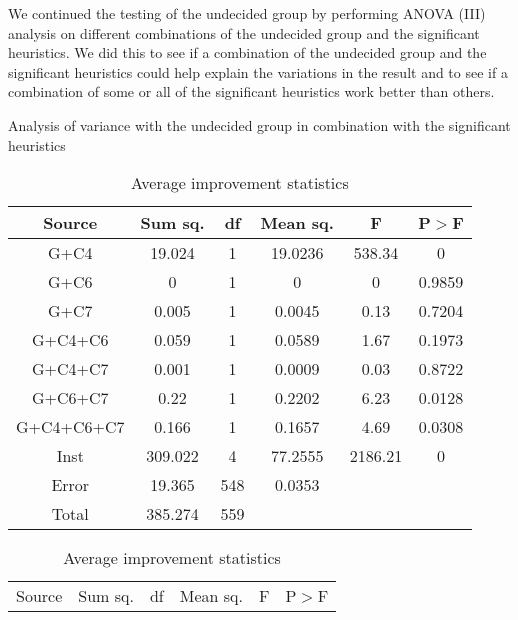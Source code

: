 \documentclass[../main.tex]{subfiles}
\begin{document}
We continued the testing of the undecided group by performing ANOVA (III) analysis on different combinations of the undecided group and the significant heuristics. 
We did this to see if a combination of the undecided group and the significant heuristics could help explain the variations in the result and to see if a combination of some or all of the significant heuristics work better than others.

\begin{table}
    \centering
    \caption{Analysis of variance with the undecided group in combination with the significant heuristics}
    \begin{adjustbox}{width=\columnwidth,center}
        \begin{subtable}{.75\columnwidth}
            \centering
            \begin{tabular}{cccccc}
            \hline
            Source  &Sum sq.    &df &Mean sq.   &F      &P$>$F \\ 
            \hline
            G+C4        & 19.024    & 1 & 19.0236   & 538.34& 0     \\
            G+C6        & 0         & 1 & 0         & 0     & 0.9859\\
            G+C7        & 0.005     & 1 & 0.0045    & 0.13  & 0.7204\\
            G+C4+C6     & 0.059     & 1 & 0.0589    & 1.67  & 0.1973\\
            G+C4+C7     & 0.001     & 1 & 0.0009    & 0.03  & 0.8722\\
            G+C6+C7     & 0.22      & 1 & 0.2202    & 6.23  & 0.0128\\
            G+C4+C6+C7  & 0.166     & 1 & 0.1657    & 4.69  & 0.0308\\
            Inst        & 309.022   & 4 & 77.2555   &2186.21& 0     \\
            Error       & 19.365    &548& 0.0353    &       &       \\
            Total       & 385.274   &559&           &       &       \\
            \hline
            \end{tabular}
        \caption{Average improvement statistics}
        \label{tab:anovaAvrgGroup}
        \end{subtable}
        \hfill
        \begin{subtable}{.85\columnwidth}
            \centering
            \begin{tabular}{cccccc}
            \hline
            Source  &Sum sq.    &df &Mean sq.   &F      &P$>$F \\ 

\end{tabular}
\end{subtable}
\end{adjustbox}
\end{table}
\end{document}
